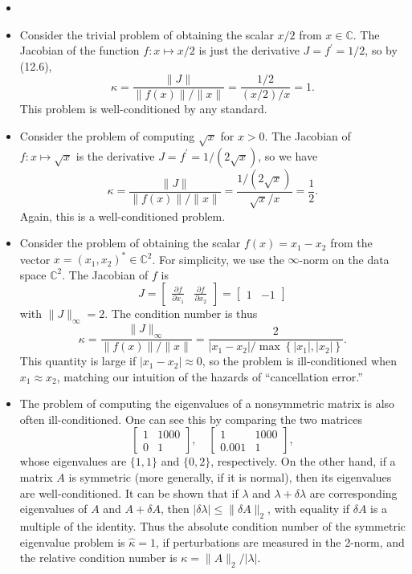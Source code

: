 \begin{example}
\begin{itemize}
    \item []
    \item  Consider the trivial problem of obtaining the scalar $x / 2$ from $x \in \mathbb{C}$. The Jacobian of the function $f: x \mapsto x / 2$ is just the derivative $J=f^{\prime}=1 / 2$, so by (12.6),
    $$
    \kappa=\frac{\|J\|}{\|f(x)\| /\|x\|}=\frac{1 / 2}{(x / 2) / x}=1 .
    $$
    This problem is well-conditioned by any standard.
    \item Consider the problem of computing $\sqrt{x}$ for $x>0$. The Jacobian of $f: x \mapsto \sqrt{x}$ is the derivative $J=f^{\prime}=1 /(2 \sqrt{x})$, so we have
    $$
    \kappa=\frac{\|J\|}{\|f(x)\| /\|x\|}=\frac{1 /(2 \sqrt{x})}{\sqrt{x} / x}=\frac{1}{2} .
    $$
    Again, this is a well-conditioned problem.
    \item Consider the problem of obtaining the scalar $f(x)=x_1-x_2$ from the vector $x=\left(x_1, x_2\right)^* \in \mathbb{C}^2$. For simplicity, we use the $\infty$-norm on the data space $\mathbb{C}^2$. The Jacobian of $f$ is
    $$
    J=\left[\begin{array}{ll}
    \frac{\partial f}{\partial x_1} & \frac{\partial f}{\partial x_2}
    \end{array}\right]=\left[\begin{array}{ll}
    1 & -1
    \end{array}\right]
    $$
    with $\|J\|_{\infty}=2$. The condition number is thus
    $$
    \kappa=\frac{\|J\|_{\infty}}{\|f(x)\| /\|x\|}=\frac{2}{\left|x_1-x_2\right| / \max \left\{\left|x_1\right|,\left|x_2\right|\right\}} .
    $$
    This quantity is large if $\left|x_1-x_2\right| \approx 0$, so the problem is ill-conditioned when $x_1 \approx x_2$, matching our intuition of the hazards of ``cancellation error.''
    \item The problem of computing the eigenvalues of a nonsymmetric matrix is also often ill-conditioned. One can see this by comparing the two matrices
    $$
    \left[\begin{array}{cc}
    1 & 1000 \\
    0 & 1
    \end{array}\right], \quad\left[\begin{array}{cc}
    1 & 1000 \\
    0.001 & 1
    \end{array}\right],
    $$
    whose eigenvalues are $\{1,1\}$ and $\{0,2\}$, respectively. On the other hand, if a matrix $A$ is symmetric (more generally, if it is normal), then its eigenvalues are well-conditioned. It can be shown that if $\lambda$ and $\lambda+\delta \lambda$ are corresponding eigenvalues of $A$ and $A+\delta A$, then $|\delta \lambda| \leq\|\delta A\|_2$, with equality if $\delta A$ is a multiple of the identity. Thus the absolute condition number of the symmetric eigenvalue problem is $\hat{\kappa}=1$, if perturbations are measured in the 2-norm, and the relative condition number is $\kappa=\|A\|_2 /|\lambda|$.
\end{itemize}
\end{example}


